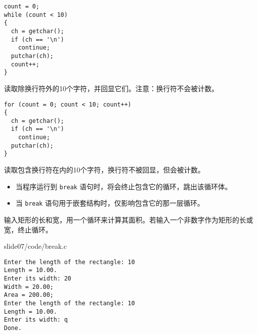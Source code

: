 \begin{frame}[fragile]
\begin{lstlisting}
count = 0;
while (count < 10)
{
  ch = getchar();
  if (ch == '\n')
    continue;
  putchar(ch);
  count++;
}
\end{lstlisting}
读取除换行符外的10个字符，并回显它们。注意：换行符不会被计数。
\end{frame}

\begin{frame}[fragile]
\begin{lstlisting}
for (count = 0; count < 10; count++)
{
  ch = getchar();
  if (ch == '\n')
    continue;
  putchar(ch);
}
\end{lstlisting}
读取包含换行符在内的10个字符，换行符不被回显，但会被计数。
\end{frame}

\begin{frame}[fragile]
\begin{itemize}
\item
当程序运行到 \lstinline|break| 语句时，将会终止包含它的循环，跳出该循环体。\\[0.1in]
\item
当 \lstinline|break| 语句用于嵌套结构时，仅影响包含它的那一层循环。
\end{itemize}
\end{frame}

\begin{frame}[fragile]
\begin{free}[例]{}
  输入矩形的长和宽，用一个循环来计算其面积。若输入一个非数字作为矩形的长或宽，终止循环。
\end{free}
\end{frame}

\begin{frame}[fragile]


{slide07/code/break.c}
\end{frame}


\begin{frame}[fragile]
\begin{lstlisting}[backgroundcolor=\color{red!10}]
Enter the length of the rectangle: 10
Length = 10.00.
Enter its width: 20
Width = 20.00;
Area = 200.00; 
Enter the length of the rectangle: 10
Length = 10.00.
Enter its width: q
Done.
\end{lstlisting}
\end{frame}

